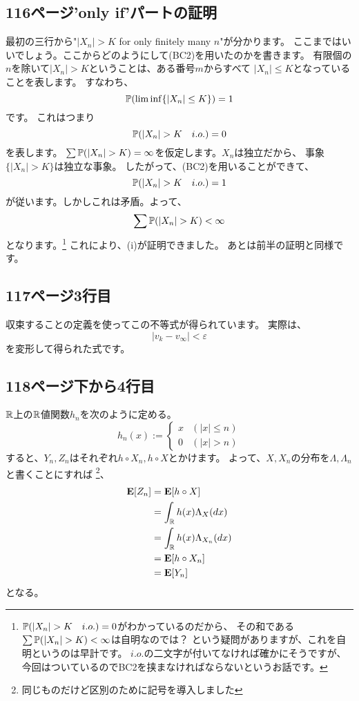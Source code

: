   \subsection{116ページ'only if'パートの証明}
    最初の三行から"$|X_n|> K$ for only finitely many $n$"が分かります。
    ここまではいいでしょう。ここからどのようにして(BC2)を用いたのかを書きます。
    有限個の$n$を除いて$|X_n|> K$ということは、ある番号$m$からすべて
    $|X_n| \leq K$となっていることを表します。
    すなわち、
    \[
      {\mathbb{P}}(\liminf \{|X_n| \leq K\}) = 1
    \]
    です。
    これはつまり
    \[
      {\mathbb{P}}(|X_n| > K \quad i.o.) = 0
    \]
    を表します。
    $\sum {\mathbb{P}}(|X_n| > K ) = \infty$を仮定します。$X_n$は独立だから、
    事象$\{|X_n| > K\}$は独立な事象。
    したがって、(BC2)を用いることができて、
    \[
      {\mathbb{P}}(|X_n| > K \quad i.o.) = 1
    \]
    が従います。しかしこれは矛盾。よって、
    \[
      \sum {\mathbb{P}}(|X_n| > K ) < \infty
    \]
    となります。\footnote{${\mathbb{P}}(|X_n| > K \quad i.o.) = 0$がわかっているのだから、
    その和である$\sum {\mathbb{P}}(|X_n| > K ) < \infty$は自明なのでは？
    という疑問がありますが、これを自明というのは早計です。
    $i.o.$の二文字が付いてなければ確かにそうですが、
    今回はついているのでBC2を挟まなければならないというお話です。}
    これにより、(i)が証明できました。
    あとは前半の証明と同様です。

  \subsection{117ページ3行目}
    収束することの定義を使ってこの不等式が得られています。
    実際は、
    \[
      |v_k - v_{\infty}| < \varepsilon
    \]
    を変形して得られた式です。

  \subsection{118ページ下から4行目}
    ${\mathbb{R}}$上の${\mathbb{R}}$値関数$h_n$を次のように定める。
    \[
      h_n(x) := \begin{cases}
        x & (|x| \leq n) \\
        0 & (|x| > n)
    \end{cases}
    \]
    すると、$Y_n,Z_n$はそれぞれ$h \circ X_n, h \circ X$とかけます。
    よって、$X,X_n$の分布を$\Lambda, \Lambda_n$と書くことにすれば
    \footnote{同じものだけど区別のために記号を導入しました}、
    \begin{align*}
      {\mathbf{E}}[Z_n] &= {\mathbf{E}}[h \circ X] \\
      &= \int_{{\mathbb{R}}} h(x) \Lambda_X(dx) \\
      &= \int_{{\mathbb{R}}} h(x) \Lambda_{X_n}(dx) \\
      &= {\mathbf{E}}[h \circ X_n]\\
      &= {\mathbf{E}}[Y_n]
    \end{align*}
    となる。

